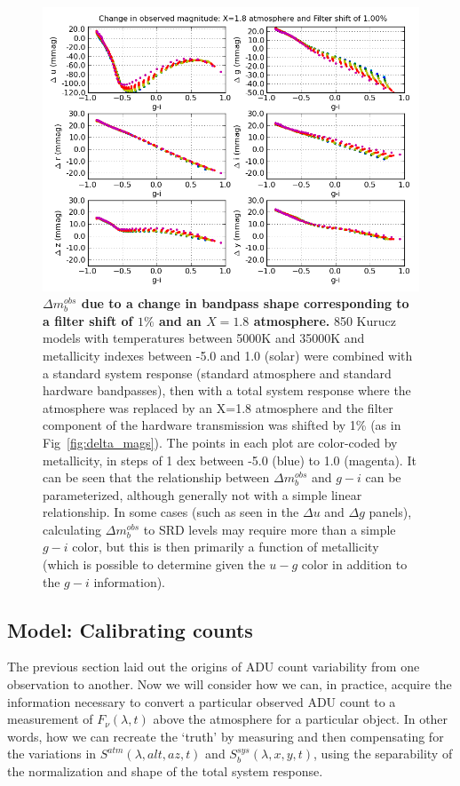 \documentclass[12pt,preprint]{aastex}
\begin{document}
\begin{figure}[htbp]
\includegraphics[width=6in]{delta_mags2}
\caption{ {\small {\bf $\Delta m_b^{obs}$ due to
a change in bandpass shape corresponding to a filter shift of $1\%$
and an $X=1.8$ atmosphere.} 850 Kurucz models with temperatures
between 5000K and 35000K and metallicity indexes between -5.0 and 1.0
(solar) were combined with a standard system response (standard
atmosphere and standard hardware bandpasses), then with a total system
response where the atmosphere was replaced by an X=1.8 atmosphere and
the filter component of the hardware transmission was shifted by 1\%
(as in Fig~\ref{fig:delta_mags}). The points in each plot are color-coded by
metallicity, in steps of 1 dex between -5.0 (blue) to 1.0 (magenta).  It can be seen that the
relationship between $\Delta m_b^{obs}$ and $g-i$ can be parameterized,
although generally not with a simple linear relationship. In some
cases (such as seen in the $\Delta u$ and $\Delta g$ panels),
calculating $\Delta m_b^{obs}$ to SRD levels may require more than a simple
$g-i$ color, but this is then primarily a function of metallicity
(which is possible to determine given the $u-g$ color in addition to
the $g-i$ information). }
\label{fig:delta_mags2} }
\end{figure}


\subsection{Model: Calibrating counts}
\label{sec:counts2photons}

The previous section laid out the origins of ADU count variability
from one observation to another. Now we will consider how we can, in
practice, acquire the information necessary to convert a particular
observed ADU count to a measurement of $F_\nu(\lambda,t)$ above the
atmosphere for a particular object.  In other words, how we can
recreate the `truth' by measuring and then compensating for the variations in
$S^{atm}(\lambda,alt,az,t)$ and $S_b^{sys}(\lambda,x,y,t)$, using the
separability of the normalization and shape of the total system
response.
\end{document}

